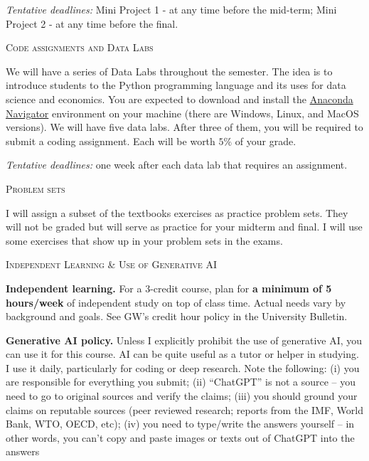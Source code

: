 \documentclass[11pt]{article}
\begin{document}
\smallskip
\textit{Tentative deadlines:} Mini Project 1 - at any time before the mid-term; Mini Project 2 - at any time before the final. 

\bigskip

\noindent\textsc{Code assignments and Data Labs}

\smallskip
We will have a series of Data Labs throughout the semester. The idea is to introduce students to the Python programming language and its uses for data science and economics. You are expected to download and install the \href{https://www.anaconda.com/download}{Anaconda Navigator} environment on your machine (there are Windows, Linux, and MacOS versions). We will have five data labs. After three of them, you will be required to submit a coding assignment. Each will be worth $5\%$ of your grade. 

\smallskip
\textit{Tentative deadlines:} one week after each data lab that requires an assignment.

\bigskip

\noindent\textsc{Problem sets}

\smallskip
I will assign a subset of the textbooks exercises as practice problem sets. They will not be graded but will serve as practice for your midterm and final. I will use some exercises that show up in your problem sets in the exams.


\bigskip


\noindent\textsc{Independent Learning \& Use of Generative AI}

\smallskip
\textbf{Independent learning.} For a 3-credit course, plan for \textbf{a minimum of 5 hours/week} of independent study on top of class time. Actual needs vary by background and goals. See GW’s credit hour policy in the University Bulletin.

\smallskip
\textbf{Generative AI policy.} Unless I explicitly prohibit the use of generative AI, you can use it for this course. AI can be quite useful as a tutor or helper in studying. I use it daily, particularly for coding or deep research. Note the following: (i) you are responsible for everything you submit; (ii) ``ChatGPT'' is not a source -- you need to go to original sources and verify the claims; (iii) you should ground your claims on reputable sources (peer reviewed research; reports from the IMF, World Bank, WTO, OECD, etc); (iv) you need to type/write the answers yourself -- in other words, you can't copy and paste images or texts out of ChatGPT into the answers
\end{document}
